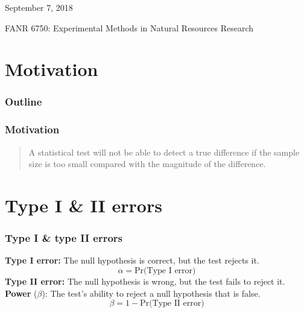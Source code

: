 \documentclass[color=usenames,dvipsnames]{beamer}\usepackage[]{graphicx}\usepackage[]{color}
\begin{document}
\begin{frame}[plain]
  \begin{center}
    \Large
    {\color{NavyBlue}{\huge \bf Power Analysis \\}}
    \vspace{2cm}
    \large
    { September 7, 2018} \par
    \vspace{1cm}
    \large
    {FANR 6750: Experimental Methods in Natural Resources
      Research}  \par
  \end{center}
\end{frame}



\section{Motivation}



\begin{frame}[plain]
  \frametitle{Outline}
   \LARGE
\end{frame}



\begin{frame}
  \frametitle{Motivation}
  \large
  \begin{quote}
    A statistical test will not be able to detect a true difference if
    the sample size is too small compared with the magnitude of the
    difference.
  \end{quote}
\end{frame}




\section{Type I \& II errors}


\begin{frame}
  \frametitle{Type I \& type II errors}
  {\bf Type I error:} The null hypothesis is correct, but the test rejects it.
  \pause
  \[
    \alpha = \text{Pr(Type I error)} %
  \]
  \pause
  \vfill
  {\bf Type II error:} The null hypothesis is wrong, but the test fails to reject it.
  \pause
  \vfill
  {\bf Power} ($\beta$): The test's ability to reject a null hypothesis that is false.
  \[
    \beta = 1 - \text{Pr(Type II error)} %
  \]
\end{frame}
\end{document}
